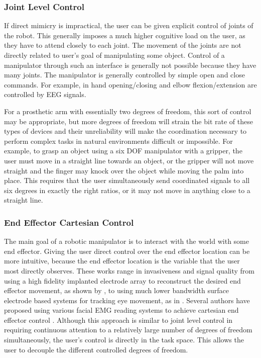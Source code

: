  \subsubsection{Joint Level Control}
If direct mimicry is impractical, the user can be given explicit control of joints of the robot. This generally imposes a much higher cognitive load on the user, as they have to attend closely to each joint. The movement of the joints are not directly related to user's goal of manipulating some object. Control of a manipulator through such an interface is generally not possible because they have many joints. The manipulator is generally controlled by simple open and close commands. For example, in \cite{Horki2011} hand opening/closing and elbow flexion/extension are controlled by EEG signals.

 For a prosthetic arm with essentially two degrees of freedom, this sort of control may be appropriate, but more degrees of freedom will strain the bit rate of these types of devices and their unreliability will make the coordination necessary to perform complex tasks in natural environments difficult or impossible. For example, to grasp an object using a six DOF manipulator with a gripper, the user must move in a straight line towards an object, or the gripper will not move straight and the finger may knock over the object while moving the palm into place.  This requires that the user simultaneously send coordinated signals to all six degrees in exactly the right ratios, or it may not move in anything close to a straight line.  

\subsubsection{End Effector Cartesian Control}
The main goal of a robotic manipulator is to interact with the world with some end effector. Giving the user direct control over the end effector location can be more intuitive, because the end effector location is the variable that the user most directly observes. These works range in invasiveness and signal quality from using a high fidelity implanted electrode array to reconstruct the desired end effector movement, as shown by  \cite{Vogel2010}, to using much lower bandwidth surface electrode based systems for tracking eye movement, as in \cite{Postelnicu2011}. Several authors have proposed using various facial EMG reading systems to achieve cartesian end effector control \cite{Sagawa2005,Gomez-Gil2011,Ranky2010,Shenoy2008}.  Although this approach is similar to joint level control in requiring continuous attention to a relatively large number of degrees of freedom simultaneously, the user's control is directly in the task space. This allows the user to decouple the different controlled degrees of freedom.   

